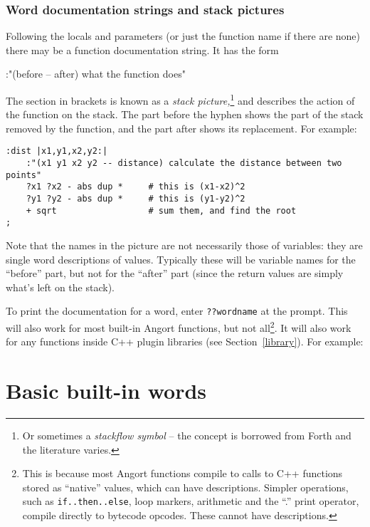 \subsubsection{Word documentation strings and stack pictures}
\label{stackpic}
Following the locals and parameters (or just the function name if there
are none) there may be a function documentation string. It has the form
\begin{v}
:"(before -- after) what the function does"
\end{v}
The section in brackets is known as a \emph{stack picture,}\footnote{Or sometimes
a \emph{stackflow symbol} -- the concept is borrowed from Forth and the literature
varies.} and describes
the action of the function on the stack. The part before the hyphen
shows the part of the stack removed by the function, and the part after
shows its replacement. For example:
\begin{lstlisting}
:dist |x1,y1,x2,y2:|
    :"(x1 y1 x2 y2 -- distance) calculate the distance between two points"
    ?x1 ?x2 - abs dup *     # this is (x1-x2)^2
    ?y1 ?y2 - abs dup *     # this is (y1-y2)^2
    + sqrt                  # sum them, and find the root
;
\end{lstlisting}
Note that the names in the picture are not necessarily those of variables:
they are single word descriptions of values. Typically these will be variable
names for the ``before'' part, but not for the ``after'' part (since
the return values are simply what's left on the stack).

To print the documentation for a word, enter \texttt{??wordname} at
the prompt. This will also work for most built-in Angort functions,
but not all\footnote{This is because most Angort functions compile
to calls to C++ functions stored as ``native'' values,
which can have descriptions. Simpler operations,
such as \texttt{if..then..else}, loop markers, arithmetic and the ``.'' print operator, compile directly to bytecode opcodes.
These cannot have descriptions.}. It will also work for any functions
inside C++ plugin libraries (see Section~\ref{library}). For example:


\section{Basic built-in words}
